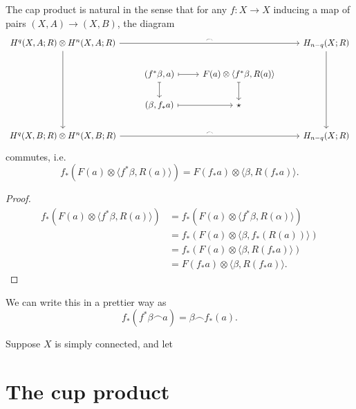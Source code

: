 \documentclass[main.tex]{subfiles}
\begin{document}
\begin{proposition}
  \label{prop:cup_product_natural}
  The cap product is natural in the sense that for any \(f\colon X \to X\) inducing a map of pairs \((X, A) \to (X, B)\), the diagram
  \begin{equation*}
    \begin{tikzcd}
      H^{q}(X, A; R) \otimes H^{n}(X, A; R)
      \arrow[rrr, "\frown"]
      \arrow[ddd]
      &&& H_{n-q}(X; R)
      \arrow[ddd]
      \\
      & (f^{*}\beta, a)
      \arrow[r, mapsto]
      \arrow[d, mapsto]
      & F(a) \otimes \langle f^{*}\beta, R(a) \rangle
      \arrow[d, mapsto]
      \\
      & (\beta, f_{*}a)
      \arrow[r, mapsto]
      & \star
      \\
      H^{q}(X, B; R) \otimes H^{n}(X, B; R)
      \arrow[rrr, "\frown"]
      &&& H_{n-q}(X; R)
    \end{tikzcd}
  \end{equation*}
  commutes, i.e.\
  \begin{equation*}
    f_{*}(F(a) \otimes \langle f^{*} \beta, R(a) \rangle) = F(f_{*}a) \otimes \langle \beta, R(f_{*}a) \rangle.
  \end{equation*}
\end{proposition}
\begin{proof}
  \begin{align*}
    f_{*}(F(a) \otimes \langle f^{*} \beta, R(a) \rangle) &= f_{*}(F(a) \otimes \langle f^{*}\beta, R(\alpha) \rangle) \\
    &= f_{*}(F(a) \otimes \langle \beta, f_{*}(R(a)) \rangle) \\
    &= f_{*}(F(a) \otimes \langle \beta, R(f_{*}a) \rangle) \\
    &= F(f_{*}a) \otimes \langle \beta, R(f_{*}a) \rangle.
  \end{align*}
\end{proof}
We can write this in a prettier way as
\begin{equation*}
  f_{*}(f^{*}\beta \frown a) = \beta \frown f_{*}(a).
\end{equation*}

\begin{example}
  Suppose \(X\) is simply connected, and let
\end{example}

\section{The cup product}
\label{sec:the_cup_product}
\end{document}
